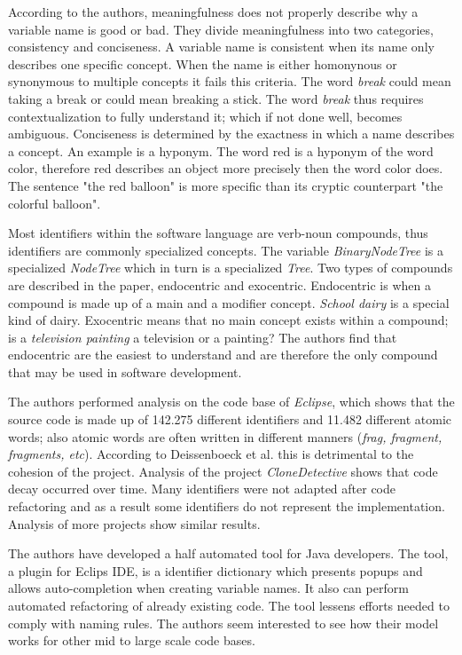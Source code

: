 \documentclass[a4paper,12pt]{article}
\begin{document}
\begin{multicols}{2}
    According to the authors, meaningfulness does not properly describe why a variable name is good or bad. They divide
    meaningfulness into two categories, consistency and conciseness. A variable name is consistent when its name only
    describes one specific concept. When the name is either homonynous or synonymous to multiple concepts it fails this
    criteria. The word \textit{break} could mean taking a break or could mean breaking a stick. The word \textit{break}
    thus requires contextualization to fully understand it; which if not done well, becomes ambiguous. Conciseness is
    determined by the exactness in which a name describes a concept. An example is a hyponym. The word red is a hyponym
    of
    the word color, therefore red describes an object more precisely then the word color does. The sentence "the red
    balloon" is
    more specific than its cryptic counterpart "the colorful balloon".

    Most identifiers within the software language are verb-noun compounds, thus identifiers are commonly specialized
    concepts. The variable \textit{BinaryNodeTree} is a specialized \textit{NodeTree} which in turn is a specialized
    \textit{Tree}. Two types of compounds are described in the paper, endocentric and exocentric. Endocentric is when a
    compound is made up of a main and a modifier concept. \textit{School dairy} is a special kind of dairy. Exocentric
    means that no main concept exists within a compound; is a \textit{television painting} a television or a painting?
    The
    authors find that endocentric are the easiest to understand and are therefore the only compound that may be used in
    software development.

    The authors performed analysis on the code base of \textit{Eclipse}, which shows that the source code is made up of
    142.275 different identifiers and 11.482 different atomic words; also atomic words are often written in different
    manners (\textit{frag, fragment, fragments, etc}). According to Deissenboeck et al. this is detrimental to the
    cohesion
    of the project. Analysis of the project \textit{CloneDetective} shows that code decay occurred over time. Many
    identifiers were not adapted after code refactoring and as a result some identifiers do not represent the
    implementation. Analysis of more projects show similar results.

    The authors have developed a half automated tool for Java developers. The tool, a plugin for Eclips IDE, is a
    identifier dictionary which presents popups and allows auto-completion when creating variable names. It also can
    perform automated refactoring of already existing code. The tool lessens efforts needed to comply with naming
    rules.
    The authors seem interested to see how their model works for other mid to large scale code bases.


\end{multicols}
\end{document}
